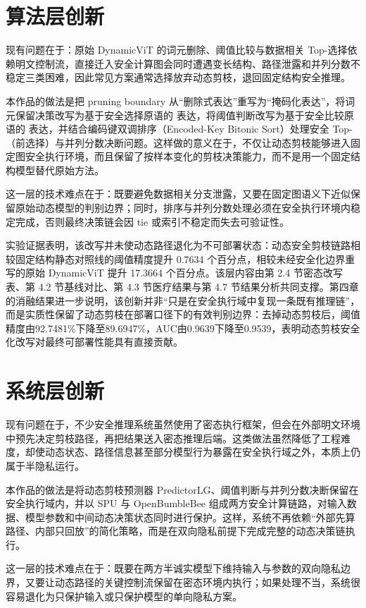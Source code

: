 \section{算法层创新}

现有问题在于：原始 DynamicViT 的词元删除、阈值比较与数据相关 Top-选择依赖明文控制流，直接迁入安全计算图会同时遭遇变长结构、路径泄露和并列分数不稳定三类困难，因此常见方案通常选择放弃动态剪枝，退回固定结构安全推理。

本作品的做法是把 pruning boundary 从“删除式表达”重写为“掩码化表达”，将词元保留决策改写为基于安全选择原语的  表达，将阈值判断改写为基于安全比较原语的  表达，并结合编码键双调排序（Encoded-Key Bitonic Sort）处理安全 Top-（前选择）与并列分数决断问题。这样做的意义在于，不仅让动态剪枝能够进入固定图安全执行环境，而且保留了按样本变化的剪枝决策能力，而不是用一个固定结构模型替代原始方法。

这一层的技术难点在于：既要避免数据相关分支泄露，又要在固定图语义下近似保留原始动态模型的判别边界；同时，排序与并列分数处理必须在安全执行环境内稳定完成，否则最终决策链会因 tie 或索引不稳定而失去可验证性。

实验证据表明，该改写并未使动态路径退化为不可部署状态：动态安全剪枝链路相较固定结构静态对照线的阈值精度提升 0.7634 个百分点，相较未经安全化边界重写的原始 DynamicViT 提升 17.3664 个百分点。该层内容由第 2.4 节密态改写表、第 4.2 节基线对比、第 4.3 节医疗结果与第 4.7 节结果分析共同支撑。第四章的消融结果进一步说明，该创新并非“只是在安全执行域中复现一条既有推理链”，而是实质性保留了动态剪枝在部署口径下的有效判别边界：去掉动态剪枝后，阈值精度由92.7481\%下降至89.6947\%，AUC由0.9639下降至0.9539，表明动态剪枝安全化改写对最终可部署性能具有直接贡献。

\section{系统层创新}

现有问题在于，不少安全推理系统虽然使用了密态执行框架，但会在外部明文环境中预先决定剪枝路径，再把结果送入密态推理后端。这类做法虽然降低了工程难度，却使动态状态、路径信息甚至部分模型行为暴露在安全执行域之外，本质上仍属于半隐私运行。

本作品的做法是将动态剪枝预测器 PredictorLG、阈值判断与并列分数决断保留在安全执行域内，并以 SPU 与 OpenBumbleBee 组成两方安全计算链路，对输入数据、模型参数和中间动态决策状态同时进行保护。这样，系统不再依赖“外部先算路径、内部只回放”的简化策略，而是在双向隐私前提下完成完整的动态决策链执行。

这一层的技术难点在于：既要在两方半诚实模型下维持输入与参数的双向隐私边界，又要让动态路径的关键控制流保留在密态环境内执行；如果处理不当，系统很容易退化为只保护输入或只保护模型的单向隐私方案。

